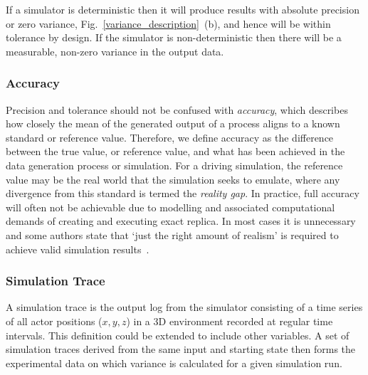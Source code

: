 \documentclass[runningheads,twocolumn,a4paper,10pt]{llncs}
\begin{document}
If a simulator is deterministic then it will produce results with absolute precision or zero variance, Fig.~\ref{variance_description}~(b), and hence will be within tolerance by design. If the simulator is non-deterministic then there will be a measurable, non-zero variance in the output data.\\
%

\subsubsection{Accuracy}
Precision and tolerance should not be confused with \textit{accuracy}, which describes how closely the mean of the generated output of a process aligns to a known standard or reference value. Therefore, we define accuracy as the difference between the true value, or reference value, and what has been achieved in the data generation process or simulation. 
%
For a driving simulation, the reference value 
may be the real world that the simulation seeks to emulate, where any divergence from this standard is termed the \textit{reality gap}. 
%
In practice, full accuracy will often not be achievable due to modelling and associated computational demands of creating and executing exact replica. In most cases it is unnecessary and some authors state that `just the right amount of realism' is required to achieve valid simulation results~\cite{Koopman2018}. \\

\subsubsection{Simulation Trace}
A simulation trace is the output log from the simulator consisting of a time series of all actor positions ($x,y,z$) in a 3D environment recorded at regular time intervals. This definition could be extended to include other variables. %
A set of simulation traces derived from the same input and starting state then forms the experimental data on which variance is calculated for a given simulation run. \\
\end{document}
